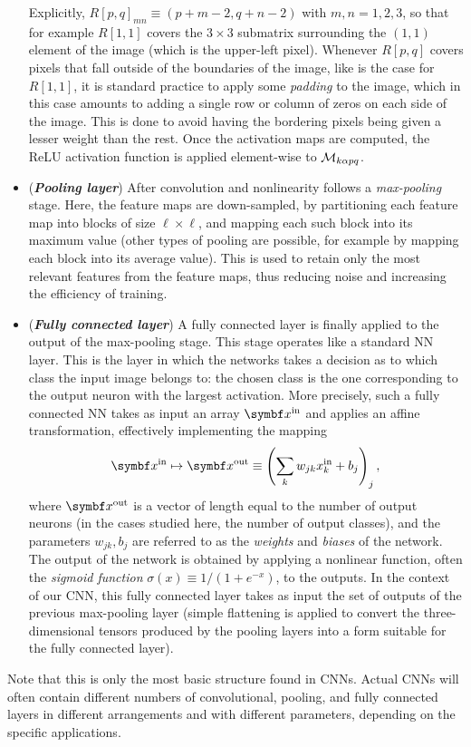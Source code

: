 \begin{itemize}
		Explicitly, $R[p,q]_{mn}\equiv (p+m-2,q+n-2)$ with $m,n=1,2,3$, so that for example $R[1,1]$ covers the $3\times3$ submatrix surrounding the $(1,1)$ element of the image (which is the upper-left pixel). Whenever $R[p,q]$ covers pixels that fall outside of the boundaries of the image, like is the case for $R[1,1]$, it is standard practice to apply some \emph{padding} to the image, which in this case amounts to adding a single row or column of zeros on each side of the image. This is done to avoid having the bordering pixels being given a lesser weight than the rest.
		Once the activation maps are computed, the ReLU activation function is applied element-wise to ${\mathcal{M}}_{k\alpha pq}$.
	\item (\textbf{\emph{Pooling layer}})
		After convolution and nonlinearity follows a \emph{max-pooling} stage. Here, the feature maps are down-sampled, by partitioning each feature map into blocks of size $\ell\times \ell$, and mapping each such block into its maximum value (other types of pooling are possible, for example by mapping each block into its average value).
		This is used to retain only the most relevant features from the feature maps, thus reducing noise and increasing the efficiency of training.
	\item (\textbf{\emph{Fully connected layer}})
		A fully connected layer is finally applied to the output of the max-pooling stage.
		This stage operates like a standard NN layer.
		This is the layer in which the networks takes a decision as to which class the input image belongs to: the chosen class is the one corresponding to the output neuron with the largest activation.
		More precisely, such a fully connected NN takes as input an array $\bs x^{\on{in}}$ and applies an affine transformation, effectively implementing the mapping
		\begin{equation}
			\bs x^{\on{in}}\mapsto \bs x^{\on{out}}
			\equiv
			\left(
				\sum_k w_{jk} x^{\on{in}}_k + b_j
			\right)_j,
		\end{equation}
		where $\bs x^{\on{out}}$ is a vector of length equal to the number of output neurons (in the cases studied here, the number of output classes), and the parameters $w_{jk},b_j$ are referred to as the \emph{weights} and \emph{biases} of the network. The output of the network is obtained by applying a nonlinear function, often the \emph{sigmoid function} $\sigma(x)\equiv 1/(1+e^{-x})$, to the outputs.
		In the context of our CNN, this fully connected layer takes as input the set of outputs of the previous max-pooling layer (simple flattening is applied to convert the three-dimensional tensors produced by the pooling layers into a form suitable for the fully connected layer).
\end{itemize}
Note that this is only the most basic structure found in CNNs. Actual CNNs will often contain different numbers of convolutional, pooling, and fully connected layers in different arrangements and with different parameters, depending on the specific applications.


